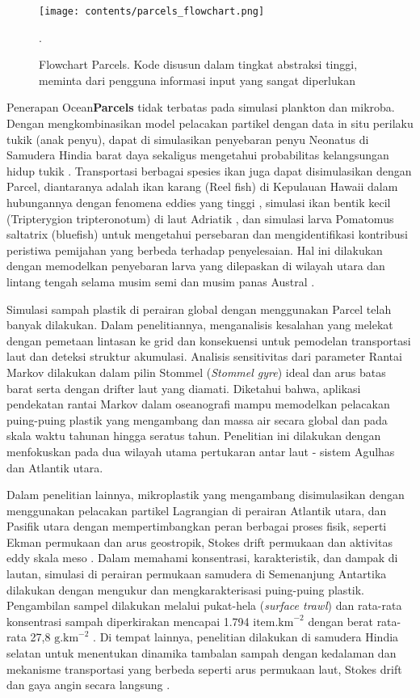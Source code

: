 \begin{spacing}{1.5}
	\begin{figure}[H]
		\centering
		\texttt{[image: contents/parcels\_flowchart.png]}
		\caption{Flowchart Parcels. Kode disusun dalam tingkat abstraksi tinggi, meminta dari pengguna informasi input yang sangat diperlukan \protect{}}.
		\label{fig:parcelsflowchart}
	\end{figure}
	\par Penerapan Ocean\textbf{Parcels} tidak terbatas pada simulasi plankton dan mikroba. Dengan mengkombinasikan model pelacakan partikel dengan data in situ perilaku tukik (anak penyu), dapat di simulasikan penyebaran penyu Neonatus di Samudera Hindia barat daya sekaligus mengetahui probabilitas kelangsungan hidup tukik . Transportasi berbagai spesies ikan juga dapat disimulasikan dengan Parcel, diantaranya adalah ikan karang (Reel fish) di Kepulauan Hawaii dalam hubungannya dengan fenomena eddies yang tinggi , simulasi ikan bentik kecil (Tripterygion tripteronotum) di laut Adriatik \cite{Sefc2020}, dan simulasi larva Pomatomus saltatrix (bluefish) untuk mengetahui persebaran dan mengidentifikasi kontribusi peristiwa pemijahan yang berbeda terhadap penyelesaian. Hal ini dilakukan dengan memodelkan penyebaran larva yang dilepaskan di wilayah utara dan lintang tengah selama musim semi dan musim panas Austral .
	\par Simulasi sampah plastik di perairan global dengan menggunakan Parcel telah banyak dilakukan. Dalam penelitiannya,  menganalisis kesalahan yang melekat dengan pemetaan lintasan ke grid dan konsekuensi untuk pemodelan transportasi laut dan deteksi struktur akumulasi. Analisis sensitivitas dari parameter Rantai Markov dilakukan dalam pilin Stommel (\textit{Stommel gyre}) ideal dan arus batas barat serta dengan drifter laut yang diamati. Diketahui bahwa, aplikasi pendekatan rantai Markov dalam oseanografi mampu memodelkan pelacakan puing-puing plastik yang mengambang dan massa air secara global dan pada skala waktu tahunan hingga seratus tahun. Penelitian ini dilakukan dengan menfokuskan pada dua wilayah utama pertukaran antar laut - sistem Agulhas dan Atlantik utara. 
	\par Dalam penelitian lainnya, mikroplastik yang mengambang disimulasikan dengan menggunakan pelacakan partikel Lagrangian di perairan Atlantik utara, dan Pasifik utara dengan mempertimbangkan peran berbagai proses fisik, seperti Ekman permukaan dan arus geostropik, Stokes drift permukaan dan aktivitas eddy skala meso . Dalam memahami konsentrasi, karakteristik, dan dampak di lautan, simulasi di perairan permukaan samudera di Semenanjung Antartika dilakukan dengan mengukur dan mengkarakterisasi puing-puing plastik. Pengambilan sampel dilakukan melalui pukat-hela (\textit{surface trawl}) dan rata-rata konsentrasi sampah diperkirakan mencapai 1.794 $\text{item.km}^{-2}$ dengan berat rata-rata 27,8 $\text{g.km}^{-2}$ . Di tempat lainnya, penelitian dilakukan di samudera Hindia selatan untuk menentukan dinamika tambalan sampah dengan kedalaman dan mekanisme transportasi yang berbeda seperti arus permukaan laut, Stokes drift dan gaya angin secara langsung .

\end{spacing}
